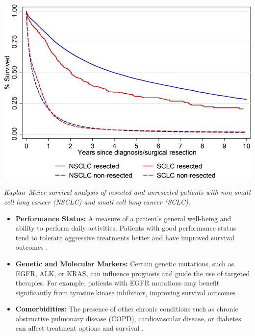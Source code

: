 \vspace{1em}
\begin{center}
    \includegraphics[width=1.00\textwidth]{../assets/05-prognosis/histological-type-survival.png}

    \small\textit{Kaplan–Meier survival analysis of resected and unresected patients with non-small 
    cell lung cancer (NSCLC) and small cell lung cancer (SCLC). \cite{article}}
\end{center}
\vspace{1em}

\begin{itemize}
    \item \textbf{Performance Status:} A measure of a patient’s general well-being and ability to 
    perform daily activities. Patients with good performance status tend to tolerate aggressive 
    treatments better and have improved survival outcomes \cite{basch2016symptoms}.

    \item \textbf{Genetic and Molecular Markers:} Certain genetic mutations, such as EGFR, ALK, or 
    KRAS, can influence prognosis and guide the use of targeted therapies. For example, patients 
    with EGFR mutations may benefit significantly from tyrosine kinase inhibitors, improving 
    survival outcomes \cite{molecular2023}.

    \item \textbf{Comorbidities:} The presence of other chronic conditions such as chronic 
    obstructive pulmonary disease (COPD), cardiovascular disease, or diabetes can affect treatment 
    options and survival \cite{copdlungcancer}.
\end{itemize}

